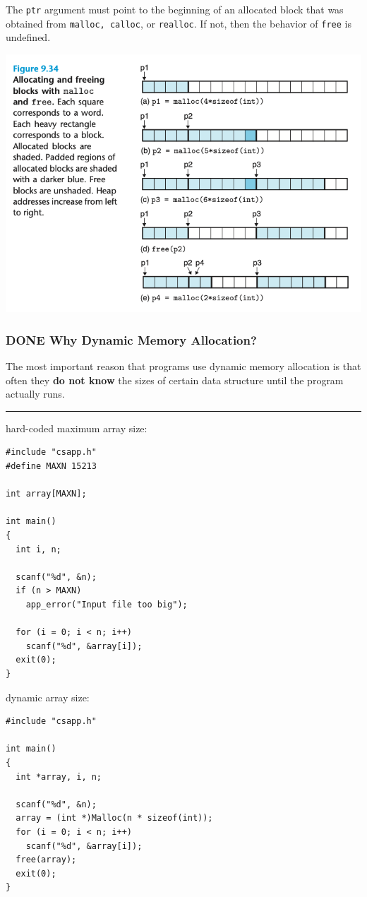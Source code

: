 \documentclass[11pt]{article}
\begin{document}
The \texttt{ptr} argument must point to the beginning of an allocated block that was obtained from \texttt{malloc, calloc}, or \texttt{realloc}. If not, then the behavior of \texttt{free} is undefined.\\

\begin{center}
\includegraphics[width=.9\linewidth]{pics/figure9.34-malloc-free.png}
\end{center}


\subsubsection{{\bfseries\sffamily DONE} Why Dynamic Memory Allocation?}
\label{sec:org08bc574}
The most important reason that programs use dynamic memory allocation is that often they \textbf{do not know} the sizes of certain data structure until the program actually runs.\\

\noindent\rule{\textwidth}{0.5pt}
hard-coded maximum array size:\\
\begin{verbatim}
#include "csapp.h"
#define MAXN 15213

int array[MAXN];

int main()
{
  int i, n;

  scanf("%d", &n);
  if (n > MAXN)
    app_error("Input file too big");

  for (i = 0; i < n; i++)
    scanf("%d", &array[i]);
  exit(0);
}

\end{verbatim}

dynamic array size:\\
\begin{verbatim}
#include "csapp.h"

int main()
{
  int *array, i, n;

  scanf("%d", &n);
  array = (int *)Malloc(n * sizeof(int));
  for (i = 0; i < n; i++)
    scanf("%d", &array[i]);
  free(array);
  exit(0);
}

\end{verbatim}
\end{document}
